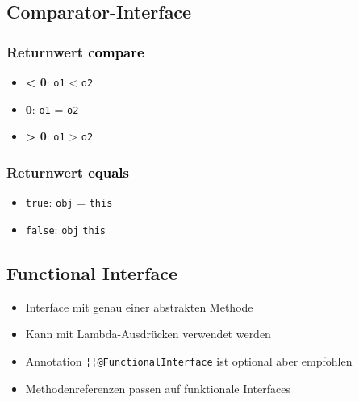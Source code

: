 \subsection{Comparator-Interface}
\vspace{-0.8\abovedisplayskip}
\begin{minipage}[t]{0.45\columnwidth}
    
\end{minipage}
\begin{minipage}[t]{0.27\columnwidth}
    \subsubsection{Returnwert \textnormal{\textsf{\textcolor{black}{compare}}}}
    \begin{itemize}
        \item \textbf{< 0}: \lstinline{o1} < \lstinline{o2}
        \item \textbf{\phantom{< }0}: \lstinline{o1} = \lstinline{o2}
        \item \textbf{> 0}: \lstinline{o1} > \lstinline{o2}
    \end{itemize}
\end{minipage}\hfill%
\begin{minipage}[t]{0.26\columnwidth}
    \subsubsection{Returnwert \textnormal{\textsf{\textcolor{black}{equals}}}}
    \begin{itemize}
        \item \lstinline{true}:\phantom{e} \lstinline{obj} = \lstinline{this}
        \item \lstinline{false}: \lstinline{obj}  \lstinline{this}
    \end{itemize}
\end{minipage}

\subsection{Functional Interface}
\begin{itemize}
    \item Interface mit genau einer abstrakten Methode
    \item Kann mit Lambda-Ausdrücken verwendet werden
    \item Annotation \lstinline{¦¦@FunctionalInterface} ist optional aber empfohlen
    \item Methodenreferenzen passen auf funktionale Interfaces
\end{itemize}
